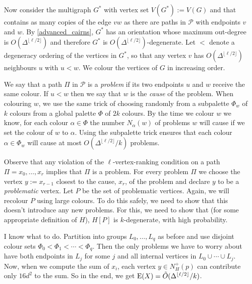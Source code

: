 \documentclass{patmorin}
\newcommand{\defin}[1]{\emph{\color{brightmaroon}#1}}
\begin{document}
Now consider the multigraph $G^*$ with vertex set $V(G^*):=V(G)$ and that contains as many copies of the edge $vw$ as there are paths in $\mathcal{P}$ with endpoints $v$ and $w$.  By \cref{advanced_cairns}, $G^*$ has an orientation whose maximum out-degree is $O(\Delta^{\lfloor\ell/2\rfloor})$ and therefore $G^*$ is $O(\Delta^{\lfloor\ell/2\rfloor})$-degenerate.  Let $<$ denote a degeneracy ordering of the vertices in $G^*$, so that any vertex $v$ has $O(\Delta^{\lfloor\ell/2\rfloor})$ neighbours $u$ with $u<w$.  We colour the vertices of $G$ in increasing order.

We say that a path $\Pi$ in $\mathcal{P}$ is a \defin{problem} if its two endpoints $u$ and $w$ receive the same colour.  If $u < w$ then we say that $w$ is the \defin{cause} of the problem.  When colouring $w$, we use the same trick of choosing randomly from a subpalette $\Phi_w$ of $k$ colours from a global palette $\Phi$ of $2k$ colours.  By the time we colour $w$ we know, for each colour $\alpha\in \Phi$ the number $N_\alpha(w)$ of problems $w$ will cause if we set the colour of $w$ to $\alpha$.  Using the subpalette trick ensures that each colour $\alpha\in\Phi_w$ will cause at most $O(\Delta^{\lfloor\ell/2\rfloor}/k)$ problems.

Observe that any violation of the $\ell$-vertex-ranking condition on a path $\Pi=x_0,\ldots,x_r$ implies that $\Pi$ is a problem.  For every problem $\Pi$ we choose the vertex $y:=x_{r-1}$ closest to the cause, $x_r$, of the problem and declare $y$ to be a \defin{problematic} vertex. Let $P$ be the set of problematic vertices.  Again, we will recolour $P$ using large colours.  To do this safely, we need to show that this doesn't introduce any new problems.  For this, we need to show that (for some appropriate definition of $H$), $H[P]$ is $k$-degenerate, with high probability.

I know what to do.  Partition into groups $L_0,\ldots,L_q$ as before and use disjoint colour sets $\Phi_0 < \Phi_1<\cdots<\Phi_q$.  Then the only problems we have to worry about have both endpoints in $L_j$ for some $j$ and all internal vertices in $L_0\cup\cdots\cup L_j$.  Now, when we compute the sum of $x_i$, each vertex $y\in N_H^+(p)$ can contribute only $16d^2$ to the sum.  So in the end, we get $\mathrm{E}(X)=\tilde{O}(\Delta^{\lfloor\ell/2\rfloor}/k)$. 
\end{document}
